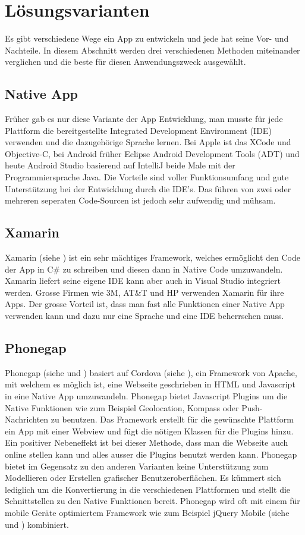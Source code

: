 \section{Lösungsvarianten}\label{loesungsvarianten}
Es gibt verschiedene Wege ein App zu entwickeln und jede hat seine Vor- und Nachteile. In diesem Abschnitt werden drei verschiedenen Methoden miteinander verglichen und die beste für diesen Anwendungszweck ausgewählt.

\subsection{Native App}\label{architektur_native}
Früher gab es nur diese Variante der App Entwicklung, man musste für jede Plattform die bereitgestellte Integrated Development Environment (IDE) verwenden und die dazugehörige Sprache lernen. Bei Apple ist das XCode und Objective-C, bei Android früher Eclipse Android Development Tools (ADT) und heute Android Studio basierend auf IntelliJ beide Male mit der Programmiersprache Java. Die Vorteile sind voller Funktionsumfang und gute Unterstützung bei der Entwicklung durch die IDE's. Das führen von zwei oder mehreren seperaten Code-Sourcen ist jedoch sehr aufwendig und mühsam.

\subsection{Xamarin}\label{architektur_xamarin}
Xamarin (siehe \cite{xamarin}) ist ein sehr mächtiges Framework, welches ermöglicht den Code der App in C\# zu schreiben und diesen dann in Native Code umzuwandeln. Xamarin liefert seine eigene IDE kann aber auch in Visual Studio integriert werden. Grosse Firmen wie 3M, AT\&T und HP verwenden Xamarin für ihre Apps. Der grosse Vorteil ist, dass man fast alle Funktionen einer Native App verwenden kann und dazu nur eine Sprache und eine IDE beherrschen muss.

\subsection{Phonegap}\label{architektur_phonegapt}
Phonegap (siehe \cite{phonegap} und \cite{wargo2012phonegap}) basiert auf Cordova (siehe \cite{cordova}), ein Framework von Apache, mit welchem es möglich ist, eine Webseite geschrieben in HTML und Javascript in eine Native App umzuwandeln. Phonegap bietet Javascript Plugins um die Native Funktionen wie zum Beispiel Geolocation, Kompass oder Push-Nachrichten zu benutzen. Das Framework erstellt für die gewünschte Plattform ein App mit einer Webview und fügt die nötigen Klassen für die Plugins hinzu. Ein positiver Nebeneffekt ist bei dieser Methode, dass man die Webseite auch online stellen kann und alles ausser die Plugins benutzt werden kann. Phonegap bietet im Gegensatz zu den anderen Varianten keine Unterstützung zum Modellieren oder Erstellen grafischer Benutzeroberflächen. Es kümmert sich lediglich um die Konvertierung in die verschiedenen Plattformen und stellt die Schnittstellen zu den Native Funktionen bereit. Phonegap wird oft mit einem für mobile Geräte optimiertem Framework wie zum Beispiel jQuery Mobile (siehe \cite{jquery_mobile} und \cite{reid2011jquery}) kombiniert.

